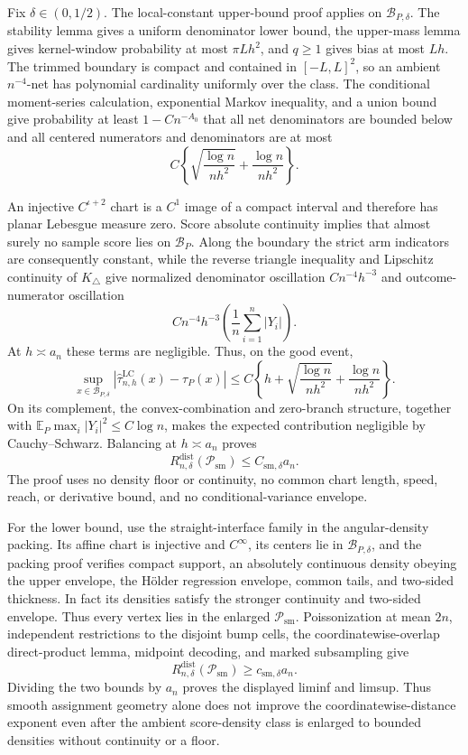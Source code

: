Fix \(\delta\in(0,1/2)\).  The local-constant upper-bound proof applies on \(\mathcal B_{P,\delta}\).  The stability lemma gives a uniform denominator lower bound, the upper-mass lemma gives kernel-window probability at most \(\pi Lh^2\), and \(q\geq1\) gives bias at most \(Lh\).  The trimmed boundary is compact and contained in \([-L,L]^2\), so an ambient \(n^{-4}\)-net has polynomial cardinality uniformly over the class.  The conditional moment-series calculation, exponential Markov inequality, and a union bound give probability at least \(1-Cn^{-A_0}\) that all net denominators are bounded below and all centered numerators and denominators are at most
\[
 C\left\{\sqrt{\frac{\log n}{nh^2}}+\frac{\log n}{nh^2}\right\}.
\]

An injective \(C^{\iota+2}\) chart is a \(C^1\) image of a compact interval and therefore has planar Lebesgue measure zero.  Score absolute continuity implies that almost surely no sample score lies on \(\mathcal B_P\).  Along the boundary the strict arm indicators are consequently constant, while the reverse triangle inequality and Lipschitz continuity of \(K_\triangle\) give normalized denominator oscillation \(Cn^{-4}h^{-3}\) and outcome-numerator oscillation
\[
 Cn^{-4}h^{-3}\left(\frac1n\sum_{i=1}^n|Y_i|\right).
\]
At \(h\asymp a_n\) these terms are negligible.  Thus, on the good event,
\[
 \sup_{x\in\mathcal B_{P,\delta}}
 |\widehat\tau^{\mathrm{LC}}_{n,h}(x)-\tau_P(x)|
 \leq C\left\{h+\sqrt{\frac{\log n}{nh^2}}+\frac{\log n}{nh^2}\right\}.
\]
On its complement, the convex-combination and zero-branch structure, together with \(\mathbb E_P\max_i|Y_i|^2\leq C\log n\), makes the expected contribution negligible by Cauchy--Schwarz.  Balancing at \(h\asymp a_n\) proves
\[
 R_{n,\delta}^{\mathrm{dist}}(\mathcal P_{\mathrm{sm}})
 \leq C_{\mathrm{sm},\delta}a_n.
\]
The proof uses no density floor or continuity, no common chart length, speed, reach, or derivative bound, and no conditional-variance envelope.

For the lower bound, use the straight-interface family in the angular-density packing.  Its affine chart is injective and \(C^\infty\), its centers lie in \(\mathcal B_{P,\delta}\), and the packing proof verifies compact support, an absolutely continuous density obeying the upper envelope, the H\"older regression envelope, common tails, and two-sided thickness.  In fact its densities satisfy the stronger continuity and two-sided envelope.  Thus every vertex lies in the enlarged \(\mathcal P_{\mathrm{sm}}\).  Poissonization at mean \(2n\), independent restrictions to the disjoint bump cells, the coordinatewise-overlap direct-product lemma, midpoint decoding, and marked subsampling give
\[
 R_{n,\delta}^{\mathrm{dist}}(\mathcal P_{\mathrm{sm}})
 \geq c_{\mathrm{sm},\delta}a_n.
\]
Dividing the two bounds by \(a_n\) proves the displayed liminf and limsup.  Thus smooth assignment geometry alone does not improve the coordinatewise-distance exponent even after the ambient score-density class is enlarged to bounded densities without continuity or a floor.